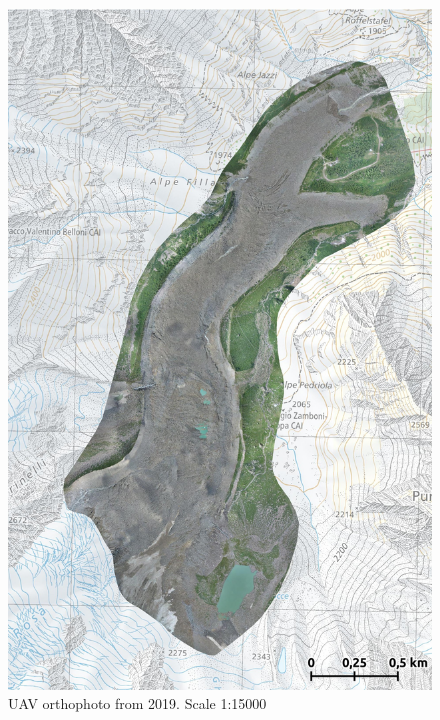 \begin{figure}[p]
    \centering
    \includegraphics[width=\textwidth]{figures/appendix/orto_2019.jpg}
    \caption{UAV orthophoto from 2019. Scale 1:15000}
\end{figure}

